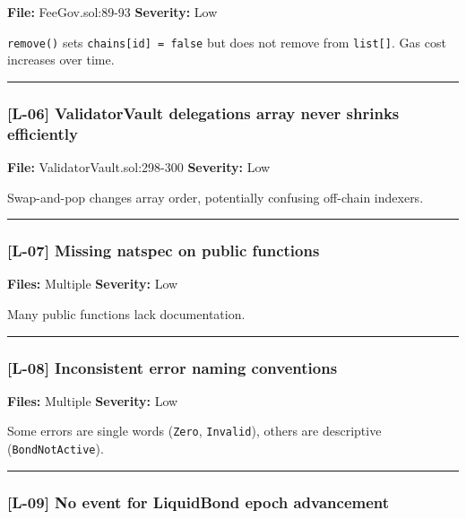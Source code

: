 \documentclass[
]{article}
\begin{document}
\textbf{File:} FeeGov.sol:89-93 \textbf{Severity:} Low

\texttt{remove()} sets \texttt{chains{[}id{]}\ =\ false} but does not
remove from \texttt{list{[}{]}}. Gas cost increases over time.

\begin{center}\rule{0.5\linewidth}{0.5pt}\end{center}

\subsubsection{{[}L-06{]} ValidatorVault delegations array never shrinks
efficiently}\label{l-06-validatorvault-delegations-array-never-shrinks-efficiently}

\textbf{File:} ValidatorVault.sol:298-300 \textbf{Severity:} Low

Swap-and-pop changes array order, potentially confusing off-chain
indexers.

\begin{center}\rule{0.5\linewidth}{0.5pt}\end{center}

\subsubsection{{[}L-07{]} Missing natspec on public
functions}\label{l-07-missing-natspec-on-public-functions}

\textbf{Files:} Multiple \textbf{Severity:} Low

Many public functions lack documentation.

\begin{center}\rule{0.5\linewidth}{0.5pt}\end{center}

\subsubsection{{[}L-08{]} Inconsistent error naming
conventions}\label{l-08-inconsistent-error-naming-conventions}

\textbf{Files:} Multiple \textbf{Severity:} Low

Some errors are single words (\texttt{Zero}, \texttt{Invalid}), others
are descriptive (\texttt{BondNotActive}).

\begin{center}\rule{0.5\linewidth}{0.5pt}\end{center}

\subsubsection{{[}L-09{]} No event for LiquidBond epoch
advancement}\label{l-09-no-event-for-liquidbond-epoch-advancement}
\end{document}
